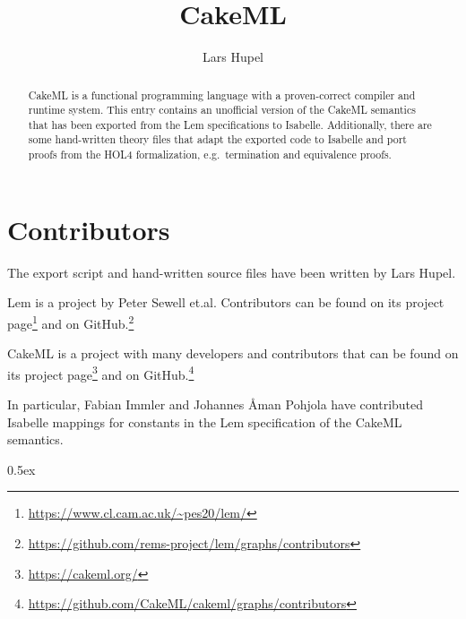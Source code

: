 \documentclass[11pt,a4paper]{report}
\begin{document}
\title{CakeML}
\author{Lars Hupel}
\maketitle

\begin{abstract}
  CakeML is a functional programming language with a proven-correct compiler and runtime system.
  This entry contains an unofficial version of the CakeML semantics that has been exported from the Lem specifications to Isabelle.
  Additionally, there are some hand-written theory files that adapt the exported code to Isabelle and port proofs from the HOL4 formalization, e.g.\ termination and equivalence proofs.
\end{abstract}

\tableofcontents

\clearpage

\section*{Contributors}

The export script and hand-written source files have been written by Lars Hupel.

Lem is a project by Peter Sewell et.al.
Contributors can be found on its project page\footnote{\url{https://www.cl.cam.ac.uk/~pes20/lem/}} and on GitHub.\footnote{\url{https://github.com/rems-project/lem/graphs/contributors}}

CakeML is a project with many developers and contributors that can be found on its project page\footnote{\url{https://cakeml.org/}} and on GitHub.\footnote{\url{https://github.com/CakeML/cakeml/graphs/contributors}}

In particular, Fabian Immler and Johannes \AA{}man Pohjola have contributed Isabelle mappings for constants in the Lem specification of the CakeML semantics.

\parindent 0pt\parskip 0.5ex



%
%
\end{document}
